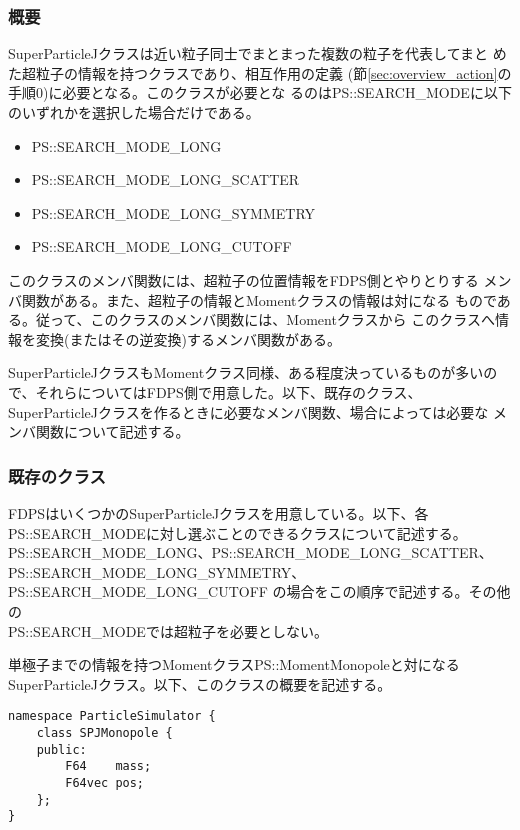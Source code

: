 \subsubsection{概要}

SuperParticleJクラスは近い粒子同士でまとまった複数の粒子を代表してまと
めた超粒子の情報を持つクラスであり、相互作用の定義
(節\ref{sec:overview_action}の手順0)に必要となる。このクラスが必要とな
るのはPS::SEARCH\_MODEに以下のいずれかを選択した場合だけである。
\begin{itemize}[itemsep=-1ex]
\item PS::SEARCH\_MODE\_LONG
\item PS::SEARCH\_MODE\_LONG\_SCATTER
\item PS::SEARCH\_MODE\_LONG\_SYMMETRY
\item PS::SEARCH\_MODE\_LONG\_CUTOFF
\end{itemize}
このクラスのメンバ関数には、超粒子の位置情報をFDPS側とやりとりする
メンバ関数がある。また、超粒子の情報とMomentクラスの情報は対になる
ものである。従って、このクラスのメンバ関数には、Momentクラスから
このクラスへ情報を変換(またはその逆変換)するメンバ関数がある。

SuperParticleJクラスもMomentクラス同様、ある程度決っているものが多いの
で、それらについてはFDPS側で用意した。以下、既存のクラス、
SuperParticleJクラスを作るときに必要なメンバ関数、場合によっては必要な
メンバ関数について記述する。

\subsubsection{既存のクラス}

FDPSはいくつかのSuperParticleJクラスを用意している。以下、各
PS::SEARCH\_MODEに対し選ぶことのできるクラスについて記述する。
PS::SEARCH\_MODE\_LONG、PS::SEARCH\_MODE\_LONG\_SCATTER、
PS::SEARCH\_MODE\_LONG\_SYMMETRY、PS::SEARCH\_MODE\_LONG\_CUTOFF
の場合をこの順序で記述する。その他の\\PS::SEARCH\_MODEでは超粒子を必要としない。


\label{sec:SPJMonopole}

単極子までの情報を持つMomentクラスPS::MomentMonopoleと対になる
SuperParticleJクラス。以下、このクラスの概要を記述する。
\begin{screen}
\begin{verbatim}
namespace ParticleSimulator {
    class SPJMonopole {
    public:
        F64    mass;
        F64vec pos;
    };
}
\end{verbatim}
\end{screen}

